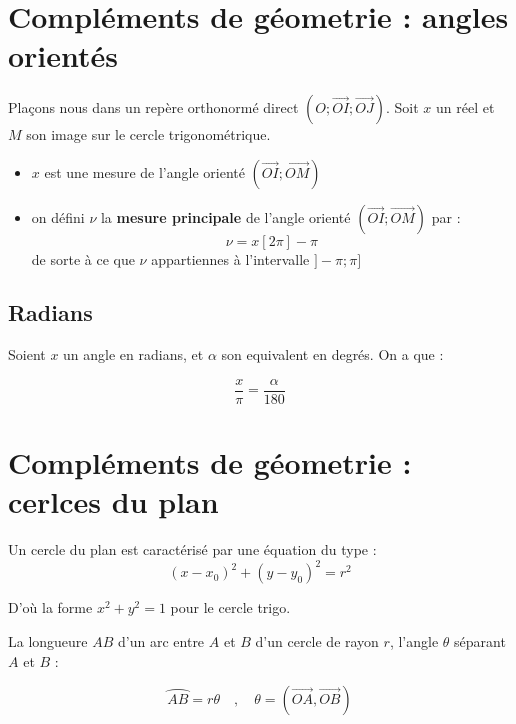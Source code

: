\documentclass{report}
\begin{document}
    ~~ \newline ~~ \newline

    \section{Compléments de géometrie : angles orientés}

      Plaçons nous dans un repère orthonormé direct $(O ; \overrightarrow{OI} ; \overrightarrow{OJ})$. Soit $x$ un réel et $M$ son image sur le cercle trigonométrique.

      \begin{itemize}[label=$\rightarrow$]
        \item $x$ est une mesure de l'angle orienté $(\overrightarrow{OI} ; \overrightarrow{OM})$
        \item on défini $\nu$ la \textbf{mesure principale} de l'angle orienté $(\overrightarrow{OI} ; \overrightarrow{OM})$ par : \[\nu = x [2\pi] - \pi\] de sorte à ce que $\nu$ appartiennes à l'intervalle $]-\pi; \pi]$
      \end{itemize}

      \subsection*{Radians}

      Soient $x$ un angle en radians, et $\alpha$ son equivalent en degrés. On a que : 

      \[\frac{x}{\pi} = \frac{\alpha}{180}\]

    \section{Compléments de géometrie : cerlces du plan}

      Un cercle du plan est caractérisé par une équation du type :
      \[(x-x_0)^2 + (y-y_0)^2 = r^2\]

      D'où la forme $x^2+y^2 = 1 $ pour le cercle trigo.

      La longueure $AB$ d'un arc entre $A$ et $B$ d'un cercle de rayon $r$, l'angle $\theta$ séparant $A$ et $B$ : 

      \[\wideparen{AB} = r\theta \quad , \quad \theta = (\overrightarrow{OA},\overrightarrow{OB})\]
\end{document}
